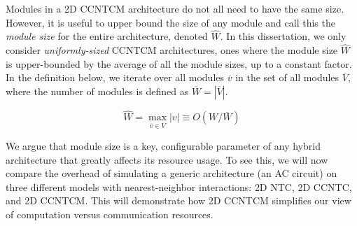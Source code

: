 Modules in a \textsf{2D CCNTCM} architecture do not all need to have the same
size. However, it is useful to upper bound the size of any module and call
this the \emph{module size} for the entire architecture, denoted $\hat{W}$.
In this 
dissertation, we only consider \emph{uniformly-sized} \textsf{CCNTCM} architectures, ones where
the module size $\hat{W}$
is upper-bounded by the average of all the module sizes, up to a constant
factor. In the definition below, we iterate over all modules $\overline{v}$
in the set of all modules $\overline{V}$, where the number of modules is
defined as $\overline{W} = |\overline{V}|$.

\begin{equation}
\hat{W} = \max_{\overline{v} \in \overline{V}} |v| \equiv O(W / \overline{W})
\end{equation}

We argue that module size is a key, configurable parameter of any
hybrid architecture that greatly affects its resource usage. To see this,
we will now compare the overhead of simulating a generic architecture
(an \textsf{AC} circuit) on three different models with nearest-neighbor
interactions: \textsf{2D NTC}, \textsf{2D CCNTC}, and \textsf{2D CCNTCM}.
This will demonstrate how \textsf{2D CCNTCM} simplifies our view of computation
versus communication resources.





